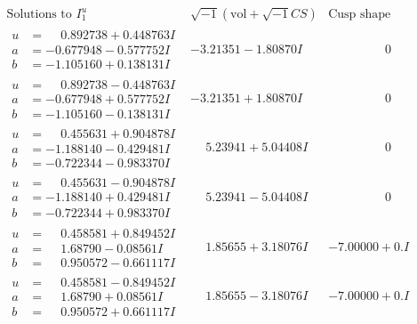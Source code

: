 \documentclass[1p]{elsarticle_modified}
\theoremstyle{definition}
\newcommand{\I}{\sqrt{-1}}
\begin{document}
$$\begin{array}{c|c|c}  
\text{Solutions to }I^u_{1}& \I (\text{vol} + \sqrt{-1}CS) & \text{Cusp shape}\\
 \hline 
\begin{aligned}
u &= \phantom{-}0.892738 + 0.448763 I \\
a &= -0.677948 - 0.577752 I \\
b &= -1.105160 + 0.138131 I\end{aligned}
 & -3.21351 - 1.80870 I & \phantom{-0.000000 } 0 \\ \hline\begin{aligned}
u &= \phantom{-}0.892738 - 0.448763 I \\
a &= -0.677948 + 0.577752 I \\
b &= -1.105160 - 0.138131 I\end{aligned}
 & -3.21351 + 1.80870 I & \phantom{-0.000000 } 0 \\ \hline\begin{aligned}
u &= \phantom{-}0.455631 + 0.904878 I \\
a &= -1.188140 - 0.429481 I \\
b &= -0.722344 - 0.983370 I\end{aligned}
 & \phantom{-}5.23941 + 5.04408 I & \phantom{-0.000000 } 0 \\ \hline\begin{aligned}
u &= \phantom{-}0.455631 - 0.904878 I \\
a &= -1.188140 + 0.429481 I \\
b &= -0.722344 + 0.983370 I\end{aligned}
 & \phantom{-}5.23941 - 5.04408 I & \phantom{-0.000000 } 0 \\ \hline\begin{aligned}
u &= \phantom{-}0.458581 + 0.849452 I \\
a &= \phantom{-}1.68790 - 0.08561 I \\
b &= \phantom{-}0.950572 - 0.661117 I\end{aligned}
 & \phantom{-}1.85655 + 3.18076 I & -7.00000 + 0. I\phantom{ +0.000000I} \\ \hline\begin{aligned}
u &= \phantom{-}0.458581 - 0.849452 I \\
a &= \phantom{-}1.68790 + 0.08561 I \\
b &= \phantom{-}0.950572 + 0.661117 I\end{aligned}
 & \phantom{-}1.85655 - 3.18076 I & -7.00000 + 0. I\phantom{ +0.000000I} \\ \hline\begin{aligned}

\end{aligned}
\end{array}$$
\end{document}
